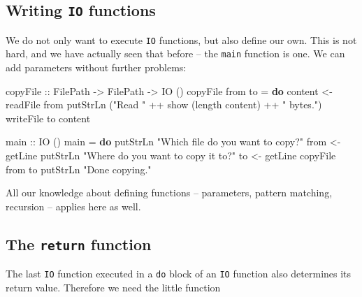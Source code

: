 \documentclass[11pt,
  american,
  DIV13]{article}
\newenvironment{Shaded}{}{}
\newcommand{\DataTypeTok}[1]{\textcolor[rgb]{0.56,0.13,0.00}{#1}}
\newcommand{\FunctionTok}[1]{\textcolor[rgb]{0.02,0.16,0.49}{#1}}
\newcommand{\KeywordTok}[1]{\textcolor[rgb]{0.00,0.44,0.13}{\textbf{#1}}}
\newcommand{\NormalTok}[1]{#1}
\newcommand{\OperatorTok}[1]{\textcolor[rgb]{0.40,0.40,0.40}{#1}}
\newcommand{\OtherTok}[1]{\textcolor[rgb]{0.00,0.44,0.13}{#1}}
\newcommand{\StringTok}[1]{\textcolor[rgb]{0.25,0.44,0.63}{#1}}
\begin{document}
\hypertarget{writing-io-functions}{%
\subsection{\texorpdfstring{Writing \texttt{IO}
functions}{Writing IO functions}}\label{writing-io-functions}}

We do not only want to execute \texttt{IO} functions, but also define
our own. This is not hard, and we have actually seen that before -- the
\texttt{main} function is one. We can add parameters without further
problems:

\begin{Shaded}
\begin{Highlighting}[]
\OtherTok{copyFile ::} \DataTypeTok{FilePath} \OtherTok{{-}\textgreater{}} \DataTypeTok{FilePath} \OtherTok{{-}\textgreater{}} \DataTypeTok{IO}\NormalTok{ ()}
\NormalTok{copyFile from to }\OtherTok{=} \KeywordTok{do}
\NormalTok{    content }\OtherTok{\textless{}{-}} \FunctionTok{readFile}\NormalTok{ from}
    \FunctionTok{putStrLn}\NormalTok{ (}\StringTok{"Read "} \OperatorTok{++} \FunctionTok{show}\NormalTok{ (}\FunctionTok{length}\NormalTok{ content) }\OperatorTok{++} \StringTok{" bytes."}\NormalTok{)}
    \FunctionTok{writeFile}\NormalTok{ to content}

\OtherTok{main ::} \DataTypeTok{IO}\NormalTok{ ()}
\NormalTok{main }\OtherTok{=} \KeywordTok{do}
    \FunctionTok{putStrLn} \StringTok{"Which file do you want to copy?"}
\NormalTok{    from }\OtherTok{\textless{}{-}} \FunctionTok{getLine}
    \FunctionTok{putStrLn} \StringTok{"Where do you want to copy it to?"}
\NormalTok{    to }\OtherTok{\textless{}{-}} \FunctionTok{getLine}
\NormalTok{    copyFile from to}
    \FunctionTok{putStrLn} \StringTok{"Done copying."}
\end{Highlighting}
\end{Shaded}

All our knowledge about defining functions -- parameters, pattern
matching, recursion -- applies here as well.

\hypertarget{the-return-function}{%
\subsection{\texorpdfstring{The \texttt{return}
function}{The return function}}\label{the-return-function}}

The last \texttt{IO} function executed in a \texttt{do} block of an
\texttt{IO} function also determines its return value. Therefore we need
the little function
\end{document}
